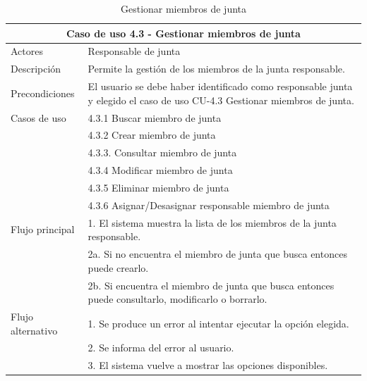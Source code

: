 \begin{table}[H]
    \caption{Gestionar miembros de junta}
    \label{tab:CU-4.3}
    \begin{center}
        \begin{tabular}{|l|p{12cm}|}
            \hline
            \multicolumn{2}{|c|}{Caso de uso 4.3 - Gestionar miembros de junta} \\
            \hline \hline
            Actores                 &   Responsable de junta          \\  
            \hline
            Descripción             &   Permite la gestión de los miembros de la junta responsable. \\  \hline
            Precondiciones          &   El usuario se debe haber identificado como responsable junta y elegido el caso de uso CU-4.3 Gestionar miembros de junta. \\  \hline
            Casos de uso            & 
            4.3.1 Buscar miembro de junta \\ 
            &
            4.3.2 Crear  miembro de junta \\ 
            & 
            4.3.3. Consultar miembro de junta\\ 
            & 
            4.3.4 Modificar miembro de junta \\ 
            &  
            4.3.5 Eliminar miembro de junta \\ 
            &
            4.3.6 Asignar/Desasignar responsable miembro de junta \\
            \hline
   
            Flujo principal         &   1. El sistema muestra la lista de los miembros de la junta responsable.   \\ 
            & 2a. Si no encuentra el miembro de junta que busca entonces puede crearlo. \\ 
            & 2b. Si encuentra el miembro de junta que busca entonces puede consultarlo, modificarlo o borrarlo. \\ \hline
            Flujo alternativo    &   1. Se produce un error al intentar ejecutar la opción elegida.  \\ 
            & 2. Se informa del error al usuario. \\
            & 3. El sistema vuelve a mostrar las opciones disponibles. \\
            \hline
        \end{tabular}
    \end{center}
\end{table}

